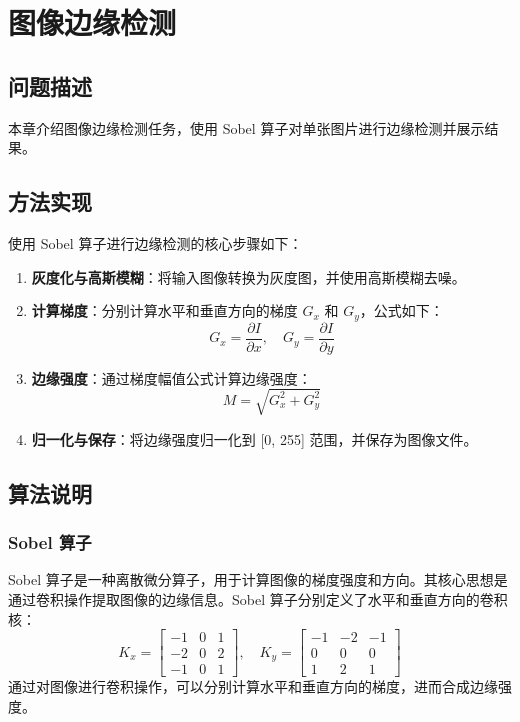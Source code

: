 \chapter{图像边缘检测}

\section{问题描述}
本章介绍图像边缘检测任务，使用 Sobel 算子对单张图片进行边缘检测并展示结果。

\section{方法实现}
使用 Sobel 算子进行边缘检测的核心步骤如下：
\begin{enumerate}
    \item \textbf{灰度化与高斯模糊}：将输入图像转换为灰度图，并使用高斯模糊去噪。
    \item \textbf{计算梯度}：分别计算水平和垂直方向的梯度 $G_x$ 和 $G_y$，公式如下：
    \begin{equation}
    G_x = \frac{\partial I}{\partial x}, \quad G_y = \frac{\partial I}{\partial y}
    \end{equation}
    \item \textbf{边缘强度}：通过梯度幅值公式计算边缘强度：
    \begin{equation}
    M = \sqrt{G_x^2 + G_y^2}
    \end{equation}
    \item \textbf{归一化与保存}：将边缘强度归一化到 [0, 255] 范围，并保存为图像文件。
\end{enumerate}

\section{算法说明}
\subsection{Sobel 算子}
Sobel 算子是一种离散微分算子，用于计算图像的梯度强度和方向。其核心思想是通过卷积操作提取图像的边缘信息。Sobel 算子分别定义了水平和垂直方向的卷积核：
\begin{equation}
K_x = \begin{bmatrix}
-1 & 0 & 1 \\
-2 & 0 & 2 \\
-1 & 0 & 1
\end{bmatrix}, \quad
K_y = \begin{bmatrix}
-1 & -2 & -1 \\
 0 &  0 &  0 \\
 1 &  2 &  1
\end{bmatrix}
\end{equation}
通过对图像进行卷积操作，可以分别计算水平和垂直方向的梯度，进而合成边缘强度。

